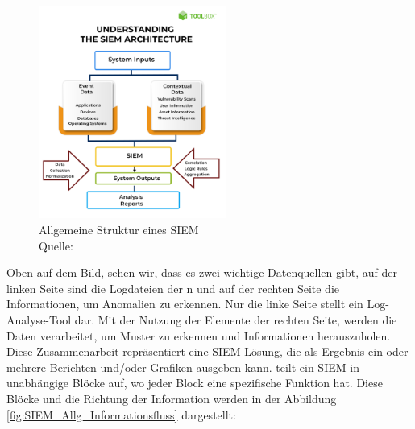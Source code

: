 
\begin{figure}[H]
   \centering
   \includegraphics[width=0.55\textwidth]{assets/2_p1.png}
   \caption[Allgemeine Struktur von \gls{SIEM}]
   {Allgemeine Struktur eines \gls{SIEM}\\Quelle: \citep{Mohanan_What} }
   \label{fig:SIEM_Allg_Struktur}
   \centering
\end{figure}

Oben auf dem Bild, sehen wir, dass es zwei wichtige Datenquellen gibt, auf der linken Seite sind die Logdateien der n und auf der rechten Seite die Informationen, um Anomalien zu erkennen. Nur die linke Seite stellt ein Log-Analyse-Tool dar. Mit der Nutzung der Elemente der rechten Seite, werden die Daten verarbeitet, um Muster zu erkennen und Informationen herauszuholen. Diese Zusammenarbeit repräsentiert eine \gls{SIEM}-Lösung, die als Ergebnis ein oder mehrere Berichten und/oder Grafiken ausgeben kann. \cite{Granadillo_SIEM} teilt ein \gls{SIEM} in unabhängige Blöcke auf, wo jeder Block eine spezifische Funktion hat. Diese Blöcke und die Richtung der Information werden in der Abbildung \ref{fig:SIEM_Allg_Informationsfluss} dargestellt:




